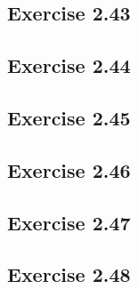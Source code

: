 \documentclass[../Marcus.tex]{subfiles}
\begin{document}
\subsection*{Exercise 2.43}

\subsection*{Exercise 2.44}

\subsection*{Exercise 2.45}

\subsection*{Exercise 2.46}

\subsection*{Exercise 2.47}

\subsection*{Exercise 2.48}
\phantom{}
\end{document}
